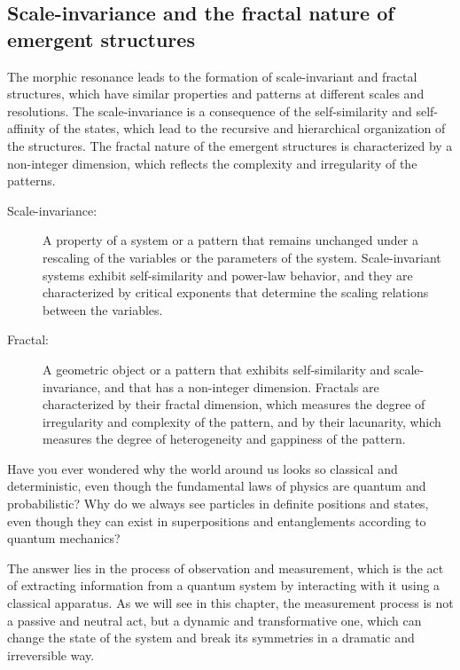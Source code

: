 \subsection{Scale-invariance and the fractal nature of emergent structures}
The morphic resonance leads to the formation of scale-invariant and fractal structures, which have similar properties and patterns at different scales and resolutions. The scale-invariance is a consequence of the self-similarity and self-affinity of the states, which lead to the recursive and hierarchical organization of the structures. The fractal nature of the emergent structures is characterized by a non-integer dimension, which reflects the complexity and irregularity of the patterns.

\begin{tcolorbox}[colback=blue!5!white,colframe=blue!75!black,title=New terms]
    \begin{description}
        \item[Scale-invariance:] A property of a system or a pattern that remains unchanged under a rescaling of the variables or the parameters of the system. Scale-invariant systems exhibit self-similarity and power-law behavior, and they are characterized by critical exponents that determine the scaling relations between the variables.
        \item[Fractal:] A geometric object or a pattern that exhibits self-similarity and scale-invariance, and that has a non-integer dimension. Fractals are characterized by their fractal dimension, which measures the degree of irregularity and complexity of the pattern, and by their lacunarity, which measures the degree of heterogeneity and gappiness of the pattern.
    \end{description}
\end{tcolorbox}
Have you ever wondered why the world around us looks so classical and deterministic, even though the fundamental laws of physics are quantum and probabilistic? Why do we always see particles in definite positions and states, even though they can exist in superpositions and entanglements according to quantum mechanics?

The answer lies in the process of observation and measurement, which is the act of extracting information from a quantum system by interacting with it using a classical apparatus. As we will see in this chapter, the measurement process is not a passive and neutral act, but a dynamic and transformative one, which can change the state of the system and break its symmetries in a dramatic and irreversible way.

